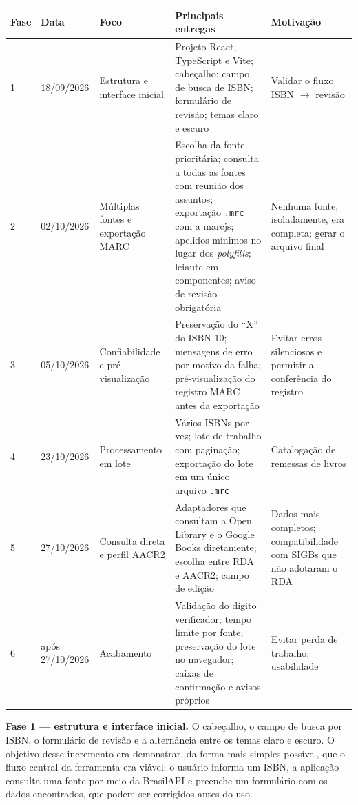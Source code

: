 \begin{quadro}[htbp]
    \centering
    \caption{Fases do desenvolvimento do Cataloga+}
    \label{qua:linha-desenvolvimento}
    \footnotesize
    \begin{tabular}{|p{}|p{}|p{}|p{}|p{}|}
        \hline
        \textbf{Fase} & \textbf{Data} & \textbf{Foco} & \textbf{Principais entregas} & \textbf{Motivação} \\ \hline
        1 & 18/09/2026 & Estrutura e interface inicial & Projeto React, TypeScript e Vite; cabeçalho; campo de busca de ISBN; formulário de revisão; temas claro e escuro & Validar o fluxo ISBN $\rightarrow$ revisão \\ \hline
        2 & 02/10/2026 & Múltiplas fontes e exportação MARC & Escolha da fonte prioritária; consulta a todas as fontes com reunião dos assuntos; exportação \texttt{.mrc} com a marcjs; apelidos mínimos no lugar dos \textit{polyfills}; leiaute em componentes; aviso de revisão obrigatória & Nenhuma fonte, isoladamente, era completa; gerar o arquivo final \\ \hline
        3 & 05/10/2026 & Confiabilidade e pré-visualização & Preservação do ``X'' do ISBN-10; mensagens de erro por motivo da falha; pré-visualização do registro MARC antes da exportação & Evitar erros silenciosos e permitir a conferência do registro \\ \hline
        4 & 23/10/2026 & Processamento em lote & Vários ISBNs por vez; lote de trabalho com paginação; exportação do lote em um único arquivo \texttt{.mrc} & Catalogação de remessas de livros \\ \hline
        5 & 27/10/2026 & Consulta direta e perfil AACR2 & Adaptadores que consultam a Open Library e o Google Books diretamente; escolha entre RDA e AACR2; campo de edição & Dados mais completos; compatibilidade com SIGBs que não adotaram o RDA \\ \hline
        6 & após 27/10/2026 & Acabamento & Validação do dígito verificador; tempo limite por fonte; preservação do lote no navegador; caixas de confirmação e avisos próprios & Evitar perda de trabalho; usabilidade \\ \hline
    \end{tabular}
\end{quadro}

\textbf{Fase 1 --- estrutura e interface inicial.} O cabeçalho, o campo de busca por ISBN, o formulário de revisão e a alternância entre os temas claro e escuro. O objetivo desse incremento era demonstrar, da forma mais simples possível, que o fluxo central da ferramenta era viável: o usuário informa um ISBN, a aplicação consulta uma fonte por meio da BrasilAPI e preenche um formulário com os dados encontrados, que podem ser corrigidos antes do uso.

